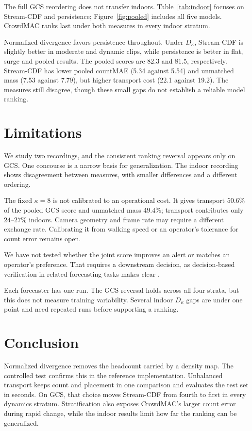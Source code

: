 \documentclass{article}
\begin{document}
The full GCS reordering does not transfer indoors. Table~\ref{tab:indoor} focuses on Stream-CDF and persistence; Figure~\ref{fig:pooled} includes all five models. CrowdMAC ranks last under both measures in every indoor stratum.

Normalized divergence favors persistence throughout. Under $D_\kappa$, Stream-CDF is slightly better in moderate and dynamic clips, while persistence is better in flat, surge and pooled results. The pooled scores are 82.3 and 81.5, respectively. Stream-CDF has lower pooled countMAE (5.34 against 5.54) and unmatched mass (7.53 against 7.79), but higher transport cost (22.1 against 19.2). The measures still disagree, though these small gaps do not establish a reliable model ranking.

\section{Limitations}
\label{sec:limitations}

We study two recordings, and the consistent ranking reversal appears only on GCS. One concourse is a narrow basis for generalization. The indoor recording shows disagreement between measures, with smaller differences and a different ordering.

The fixed $\kappa = 8$ is not calibrated to an operational cost. It gives transport $50.6\%$ of the pooled GCS score and unmatched mass $49.4\%$; transport contributes only $24$--$27\%$ indoors. Camera geometry and frame rate may require a different exchange rate. Calibrating it from walking speed or an operator's tolerance for count error remains open.

We have not tested whether the joint score improves an alert or matches an operator's preference. That requires a downstream decision, as decision-based verification in related forecasting tasks makes clear \cite{ravuri2021}.

Each forecaster has one run. The GCS reversal holds across all four strata, but this does not measure training variability. Several indoor $D_\kappa$ gaps are under one point and need repeated runs before supporting a ranking.

\section{Conclusion}
\label{sec:conclusion}

Normalized divergence removes the headcount carried by a density map. The controlled test confirms this in the reference implementation. Unbalanced transport keeps count and placement in one comparison and evaluates the test set in seconds. On GCS, that choice moves Stream-CDF from fourth to first in every dynamics stratum. Stratification also exposes CrowdMAC's larger count error during rapid change, while the indoor results limit how far the ranking can be generalized.
\end{document}
